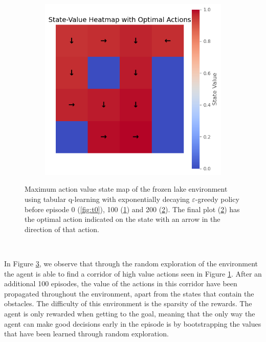 \documentclass{article}
\begin{document}
\begin{figure}[htp]
\begin{subfigure}{0.3\textwidth}
        \caption{}	
        \label{fig:t100}
    \end{subfigure}
    \hfill
    \begin{subfigure}{0.3\textwidth}
        \centering
        \includegraphics[width=\linewidth]{images/frozen_with_actions.png}
        \caption{}
        \label{fig:t200}
    \end{subfigure}
    
    \caption{Maximum action value state map of the frozen lake environment using tabular q-learning with exponentially decaying $\varepsilon$-greedy policy before episode 0 (\ref{fig:t0}), 100 (\ref{fig:t100}) and 200 (\ref{fig:t200}). The final plot (\ref{fig:t200}) has the optimal action indicated on the state with an arrow in the direction of that action. }
    \label{fig:frozen_lake_q_learning}
\end{figure}

\

In Figure \ref{fig:frozen_lake_q_learning}, we observe that through the random exploration of the environment the agent is able to find a corridor of high value actions seen in Figure \ref{fig:t100}. After an additional 100 episodes, the value of the actions in this corridor have been propagated throughout the environment, apart from the states that contain the obstacles. The difficulty of this environment is the sparsity of the rewards. The agent is only rewarded when getting to the goal, meaning that the only way the agent can make good decisions early in the episode is by bootstrapping the values that have been learned through random exploration.
\end{document}
